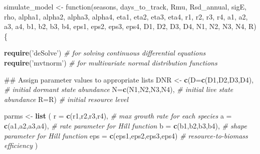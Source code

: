 \documentclass[11pt,]{article}
\newenvironment{Shaded}{\begin{snugshade}}{\end{snugshade}}
\newcommand{\KeywordTok}[1]{\textcolor[rgb]{0.13,0.29,0.53}{\textbf{{#1}}}}
\newcommand{\DataTypeTok}[1]{\textcolor[rgb]{0.13,0.29,0.53}{{#1}}}
\newcommand{\StringTok}[1]{\textcolor[rgb]{0.31,0.60,0.02}{{#1}}}
\newcommand{\CommentTok}[1]{\textcolor[rgb]{0.56,0.35,0.01}{\textit{{#1}}}}
\newcommand{\NormalTok}[1]{{#1}}
\begin{document}
\begin{Shaded}
\begin{Highlighting}[]
\NormalTok{simulate_model <-}\StringTok{ }\NormalTok{function(seasons, days_to_track, Rmu, }
                           \NormalTok{Rsd_annual, sigE, rho, }
                           \NormalTok{alpha1, alpha2, alpha3, alpha4,}
                           \NormalTok{eta1, eta2, eta3, eta4,}
                           \NormalTok{r1, r2, r3, r4,}
                           \NormalTok{a1, a2, a3, a4,}
                           \NormalTok{b1, b2, b3, b4,}
                           \NormalTok{eps1, eps2, eps3, eps4,}
                           \NormalTok{D1, D2, D3, D4,}
                           \NormalTok{N1, N2, N3, N4, R) \{}
  
  \KeywordTok{require}\NormalTok{(}\StringTok{'deSolve'}\NormalTok{) }\CommentTok{# for solving continuous differential equations}
  \KeywordTok{require}\NormalTok{(}\StringTok{'mvtnorm'}\NormalTok{) }\CommentTok{# for multivariate normal distribution functions}
  
  \NormalTok{##  Assign parameter values to appropriate lists}
  \NormalTok{DNR <-}\StringTok{ }\KeywordTok{c}\NormalTok{(}\DataTypeTok{D=}\KeywordTok{c}\NormalTok{(D1,D2,D3,D4),   }\CommentTok{# initial dormant state abundance}
           \DataTypeTok{N=}\KeywordTok{c}\NormalTok{(N1,N2,N3,N4),   }\CommentTok{# initial live state abundance}
           \DataTypeTok{R=}\NormalTok{R)                }\CommentTok{# initial resource level}
  
  \NormalTok{parms <-}\StringTok{ }\KeywordTok{list} \NormalTok{(}
    \DataTypeTok{r   =} \KeywordTok{c}\NormalTok{(r1,r2,r3,r4),          }\CommentTok{# max growth rate for each species}
    \DataTypeTok{a   =} \KeywordTok{c}\NormalTok{(a1,a2,a3,a4),          }\CommentTok{# rate parameter for Hill function }
    \DataTypeTok{b   =} \KeywordTok{c}\NormalTok{(b1,b2,b3,b4),          }\CommentTok{# shape parameter for Hill function}
    \DataTypeTok{eps =} \KeywordTok{c}\NormalTok{(eps1,eps2,eps3,eps4)   }\CommentTok{# resource-to-biomass efficiency}
  \NormalTok{)}
  

\end{Highlighting}
\end{Shaded}
\end{document}
